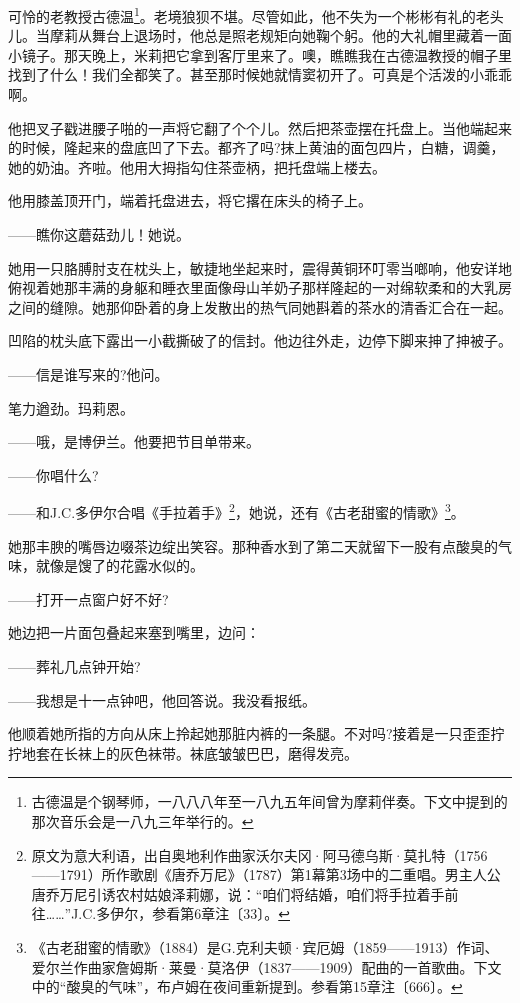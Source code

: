 \par 可怜的老教授古德温\footnote{古德温是个钢琴师，一八八八年至一八九五年间曾为摩莉伴奏。下文中提到的那次音乐会是一八九三年举行的。}。老境狼狈不堪。尽管如此，他不失为一个彬彬有礼的老头儿。当摩莉从舞台上退场时，他总是照老规矩向她鞠个躬。他的大礼帽里藏着一面小镜子。那天晚上，米莉把它拿到客厅里来了。噢，瞧瞧我在古德温教授的帽子里找到了什么！我们全都笑了。甚至那时候她就情窦初开了。可真是个活泼的小乖乖啊。
\par 他把叉子戳进腰子啪的一声将它翻了个个儿。然后把茶壶摆在托盘上。当他端起来的时候，隆起来的盘底凹了下去。都齐了吗?抹上黄油的面包四片，白糖，调羹，她的奶油。齐啦。他用大拇指勾住茶壶柄，把托盘端上楼去。
\par 他用膝盖顶开门，端着托盘进去，将它撂在床头的椅子上。
\par ——瞧你这蘑菇劲儿！她说。
\par 她用一只胳膊肘支在枕头上，敏捷地坐起来时，震得黄铜环叮零当啷响，他安详地俯视着她那丰满的身躯和睡衣里面像母山羊奶子那样隆起的一对绵软柔和的大乳房之间的缝隙。她那仰卧着的身上发散出的热气同她斟着的茶水的清香汇合在一起。
\par 凹陷的枕头底下露出一小截撕破了的信封。他边往外走，边停下脚来抻了抻被子。
\par ——信是谁写来的?他问。
\par 笔力遒劲。玛莉恩。
\par ——哦，是博伊兰。他要把节目单带来。
\par ——你唱什么?
\par ——和J.C.多伊尔合唱《手拉着手》\footnote{原文为意大利语，出自奥地利作曲家沃尔夫冈·阿马德乌斯·莫扎特（1756——1791）所作歌剧《唐乔万尼》（1787）第1幕第3场中的二重唱。男主人公唐乔万尼引诱农村姑娘泽莉娜，说：“咱们将结婚，咱们将手拉着手前往……”J.C.多伊尔，参看第6章注〔33〕。}，她说，还有《古老甜蜜的情歌》\footnote{《古老甜蜜的情歌》（1884）是G.克利夫顿·宾厄姆（1859——1913）作词、爱尔兰作曲家詹姆斯·莱曼·莫洛伊（1837——1909）配曲的一首歌曲。下文中的“酸臭的气味”，布卢姆在夜间重新提到。参看第15章注〔666〕。}。
\par 她那丰腴的嘴唇边啜茶边绽出笑容。那种香水到了第二天就留下一股有点酸臭的气味，就像是馊了的花露水似的。
\par ——打开一点窗户好不好?
\par 她边把一片面包叠起来塞到嘴里，边问：
\par ——葬礼几点钟开始?
\par ——我想是十一点钟吧，他回答说。我没看报纸。
\par 他顺着她所指的方向从床上拎起她那脏内裤的一条腿。不对吗?接着是一只歪歪拧拧地套在长袜上的灰色袜带。袜底皱皱巴巴，磨得发亮。
